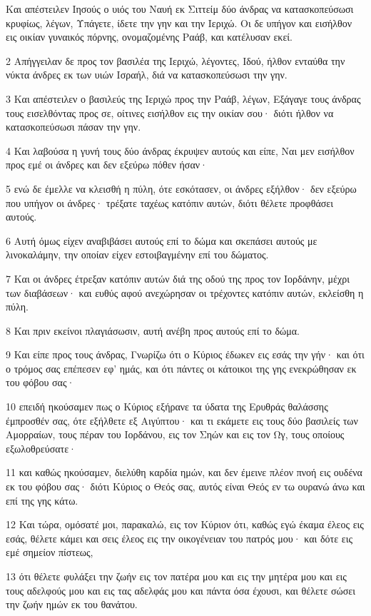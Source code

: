 \par Και απέστειλεν Ιησούς ο υιός του Ναυή εκ Σιττείμ δύο άνδρας να κατασκοπεύσωσι κρυφίως, λέγων, Υπάγετε, ίδετε την γην και την Ιεριχώ. Οι δε υπήγον και εισήλθον εις οικίαν γυναικός πόρνης, ονομαζομένης Ραάβ, και κατέλυσαν εκεί.
\par 2 Απήγγειλαν δε προς τον βασιλέα της Ιεριχώ, λέγοντες, Ιδού, ήλθον ενταύθα την νύκτα άνδρες εκ των υιών Ισραήλ, διά να κατασκοπεύσωσι την γην.
\par 3 Και απέστειλεν ο βασιλεύς της Ιεριχώ προς την Ραάβ, λέγων, Εξάγαγε τους άνδρας τους εισελθόντας προς σε, οίτινες εισήλθον εις την οικίαν σου· διότι ήλθον να κατασκοπεύσωσι πάσαν την γην.
\par 4 Και λαβούσα η γυνή τους δύο άνδρας έκρυψεν αυτούς και είπε, Ναι μεν εισήλθον προς εμέ οι άνδρες και δεν εξεύρω πόθεν ήσαν·
\par 5 ενώ δε έμελλε να κλεισθή η πύλη, ότε εσκότασεν, οι άνδρες εξήλθον· δεν εξεύρω που υπήγον οι άνδρες· τρέξατε ταχέως κατόπιν αυτών, διότι θέλετε προφθάσει αυτούς.
\par 6 Αυτή όμως είχεν αναβιβάσει αυτούς επί το δώμα και σκεπάσει αυτούς με λινοκαλάμην, την οποίαν είχεν εστοιβαγμένην επί του δώματος.
\par 7 Και οι άνδρες έτρεξαν κατόπιν αυτών διά της οδού της προς τον Ιορδάνην, μέχρι των διαβάσεων· και ευθύς αφού ανεχώρησαν οι τρέχοντες κατόπιν αυτών, εκλείσθη η πύλη.
\par 8 Και πριν εκείνοι πλαγιάσωσιν, αυτή ανέβη προς αυτούς επί το δώμα.
\par 9 Και είπε προς τους άνδρας, Γνωρίζω ότι ο Κύριος έδωκεν εις εσάς την γήν· και ότι ο τρόμος σας επέπεσεν εφ' ημάς, και ότι πάντες οι κάτοικοι της γης ενεκρώθησαν εκ του φόβου σας·
\par 10 επειδή ηκούσαμεν πως ο Κύριος εξήρανε τα ύδατα της Ερυθράς θαλάσσης έμπροσθέν σας, ότε εξήλθετε εξ Αιγύπτου· και τι εκάμετε εις τους δύο βασιλείς των Αμορραίων, τους πέραν του Ιορδάνου, εις τον Σηών και εις τον Ωγ, τους οποίους εξωλοθρεύσατε·
\par 11 και καθώς ηκούσαμεν, διελύθη καρδία ημών, και δεν έμεινε πλέον πνοή εις ουδένα εκ του φόβου σας· διότι Κύριος ο Θεός σας, αυτός είναι Θεός εν τω ουρανώ άνω και επί της γης κάτω.
\par 12 Και τώρα, ομόσατέ μοι, παρακαλώ, εις τον Κύριον ότι, καθώς εγώ έκαμα έλεος εις εσάς, θέλετε κάμει και σεις έλεος εις την οικογένειαν του πατρός μου· και δότε εις εμέ σημείον πίστεως,
\par 13 ότι θέλετε φυλάξει την ζωήν εις τον πατέρα μου και εις την μητέρα μου και εις τους αδελφούς μου και εις τας αδελφάς μου και πάντα όσα έχουσι, και θέλετε σώσει την ζωήν ημών εκ του θανάτου.
